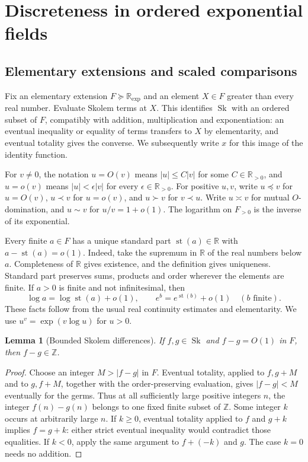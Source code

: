 \documentclass[11pt]{article}
\newtheorem{lemma}[theorem]{Lemma}
\theoremstyle{definition}
\theoremstyle{remark}
\newcommand{\Sk}{\operatorname{Sk}}
\newcommand{\R}{\mathbb R}
\newcommand{\st}{\operatorname{st}}
\newcommand{\Z}{\mathbb Z}
\newcommand{\arch}{\mathrel{\asymp}}
\numberwithin{equation}{section}
\begin{document}
\section{Discreteness in ordered exponential fields}\label{sf:sec:field}

\subsection{Elementary extensions and scaled comparisons}

Fix an elementary extension $F\succeq\R_{\exp}$ and an element
$X\in F$ greater than every real number. Evaluate Skolem terms at $X$.
This identifies $\Sk$ with an ordered subset of $F$, compatibly with
addition, multiplication and exponentiation: an eventual inequality
or equality of terms transfers to $X$ by elementarity, and eventual
totality gives the converse. We subsequently write $x$
for this image of the identity function.

For $v\ne0$, the notation $u=O(v)$ means $|u|\le C|v|$ for some
$C\in\R_{>0}$, and $u=o(v)$ means $|u|<\epsilon|v|$ for every
$\epsilon\in\R_{>0}$. For positive $u,v$, write $u\preceq v$
for $u=O(v)$, $u\prec v$ for $u=o(v)$, and $u\succ v$ for
$v\prec u$. Write $u\arch v$ for mutual $O$-domination, and
$u\sim v$ for $u/v=1+o(1)$.
The logarithm on $F_{>0}$ is the inverse of its exponential.

Every finite $a\in F$ has a unique standard part $\st(a)\in\R$
with $a-\st(a)=o(1)$. Indeed, take the supremum in $\R$ of the real
numbers below $a$. Completeness of $\R$ gives existence, and the
definition gives uniqueness. Standard part preserves sums, products
and order wherever the elements are finite. If $a>0$ is finite and
not infinitesimal, then
\[
 \log a=\log\st(a)+o(1),\qquad
 e^b=e^{\st(b)}+o(1)\quad(b\text{ finite}).
\]
These facts follow from the usual real continuity estimates and
elementarity. We use $u^v=\exp(v\log u)$ for $u>0$.

\begin{lemma}[Bounded Skolem differences]\label{sf:lem:integers}
If $f,g\in\Sk$ and $f-g=O(1)$ in $F$, then $f-g\in\Z$.
\end{lemma}
\begin{proof}
Choose an integer $M>|f-g|$ in $F$. Eventual totality, applied to
$f,g+M$ and to $g,f+M$, together with the order-preserving evaluation,
gives $|f-g|<M$ eventually for the germs. Thus
at all sufficiently large positive integers $n$, the integer
$f(n)-g(n)$ belongs to one fixed finite subset of $\Z$. Some integer
$k$ occurs at arbitrarily large $n$. If $k\ge0$, eventual totality
applied to $f$ and $g+k$ implies $f=g+k$: either strict eventual
inequality would contradict those equalities. If $k<0$, apply the
same argument to $f+(-k)$ and $g$. The case $k=0$ needs no addition.
\end{proof}
\end{document}
